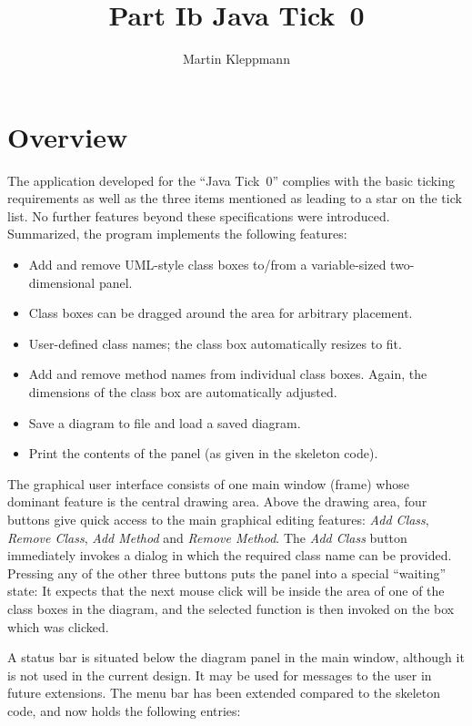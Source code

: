 \documentclass[11pt]{article}
\begin{document}
\title{Part {\sc Ib} Java Tick~0}
\author{Martin Kleppmann}
\maketitle

\section{Overview}
The application developed for the ``Java Tick~0'' complies with the basic
ticking requirements as well as the three items mentioned as leading to a
star on the tick list. No further features beyond these specifications were
introduced. Summarized, the program implements the following features:

\begin{itemize}
\item Add and remove UML-style class boxes to/from a variable-sized
    two-dimensional panel.
\item Class boxes can be dragged around the area for arbitrary placement.
\item User-defined class names; the class box automatically resizes to fit.
\item Add and remove method names from individual class boxes. Again,
     the dimensions of the class box are automatically adjusted.
\item Save a diagram to file and load a saved diagram.
\item Print the contents of the panel (as given in the skeleton code).
\end{itemize}

The graphical user interface consists of one main window (frame) whose
dominant feature is the central drawing area. Above the drawing area,
four buttons give quick access to the main graphical editing features:
{\em Add Class}, {\em Remove Class}, {\em Add Method} and {\em Remove
Method}. The {\em Add Class} button immediately invokes a dialog in which
the required class name can be provided. Pressing any of the other three
buttons puts the panel into a special ``waiting'' state: It expects that the
next mouse click will be inside the area of one of the class boxes in the
diagram, and the selected function is then invoked on the box which was
clicked.

A status bar is situated below the diagram panel in the main window, although
it is not used in the current design. It may be used for messages to the user
in future extensions. The menu bar has been extended compared to the skeleton
code, and now holds the following entries:
\end{document}
